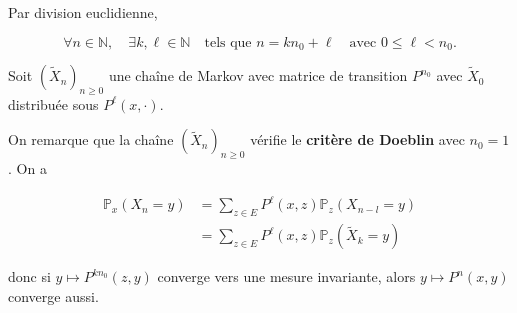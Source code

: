 \documentclass[french]{article}
\begin{document}
	Par division euclidienne,
	
	$$\forall n \in \mathbb{N}, \quad \exists k,\ell \in \mathbb{N} \quad \text{tels que } n = kn_0 + \ell \quad \text{avec $0 \leq \ell < n_0$}.$$
	
	Soit $(\tilde{X}_n)_{n \geq 0}$ une chaîne de Markov avec matrice de transition $P^{n_0}$ avec $\tilde{X}_0$ distribuée sous $P^{\ell}(x, \cdot)$.
	
	On remarque que la chaîne $(\tilde{X}_n)_{n \geq 0}$ vérifie le \textbf{critère de Doeblin} avec $n_0 = 1$. On a
	
	\begin{align}
	 \mathbb{P}_x(X_n = y) &= \sum_{z \in E} P^\ell(x,z) \mathbb{P}_z(X_{n-l} = y) \\
	 &= \sum_{z \in E} P^\ell(x,z) \mathbb{P}_z(\tilde{X}_{k} = y)
	 \end{align}
	 
	 donc si $y \mapsto P^{kn_0}(z,y)$ converge vers une mesure invariante, alors $y \mapsto P^{n}(x,y)$ converge aussi.
	
\end{document}
